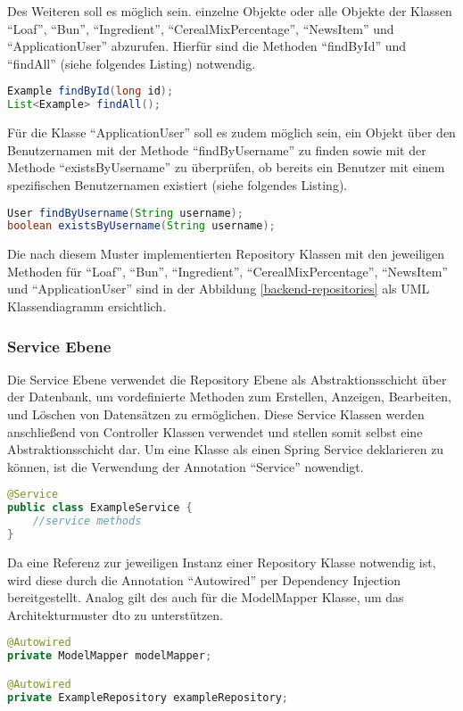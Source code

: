 Des Weiteren soll es möglich sein. einzelne Objekte oder alle Objekte der Klassen \enquote{Loaf}, \enquote{Bun}, \enquote{Ingredient}, \enquote{CerealMixPercentage}, \enquote{NewsItem} und \enquote{ApplicationUser} abzurufen.
Hierfür sind die Methoden \enquote{findById} und \enquote{findAll} (siehe folgendes Listing) notwendig.
\begin{lstlisting}[language=Java]
Example findById(long id);
List<Example> findAll();
\end{lstlisting}

\clearpage

Für die Klasse \enquote{ApplicationUser} soll es zudem möglich sein, ein Objekt über den Benutzernamen mit der Methode \enquote{findByUsername} zu finden sowie mit der Methode \enquote{existsByUsername} zu überprüfen, ob bereits ein Benutzer mit einem spezifischen Benutzernamen existiert (siehe folgendes Listing).
\begin{lstlisting}[language=Java]
User findByUsername(String username);
boolean existsByUsername(String username);
\end{lstlisting}
Die nach diesem Muster implementierten Repository Klassen mit den jeweiligen Methoden für \enquote{Loaf}, \enquote{Bun}, \enquote{Ingredient}, \enquote{CerealMixPercentage}, \enquote{NewsItem} und \enquote{ApplicationUser} sind in der Abbildung \ref{backend-repositories} als UML Klassendiagramm ersichtlich.


\clearpage

\subsubsection{Service Ebene}
Die Service Ebene verwendet die Repository Ebene als Abstraktionsschicht über der Datenbank, um vordefinierte Methoden zum Erstellen, Anzeigen, Bearbeiten, und Löschen von Datensätzen zu ermöglichen. Diese Service Klassen werden anschließend von Controller Klassen verwendet und stellen somit selbst eine Abstraktionsschicht dar.
Um eine Klasse als einen Spring Service deklarieren zu können, ist die Verwendung der Annotation \enquote{Service} nowendigt.
\begin{lstlisting}[language=Java]
@Service
public class ExampleService {
	//service methods
}
\end{lstlisting}

Da eine Referenz zur jeweiligen Instanz einer Repository Klasse notwendig ist, wird diese durch die Annotation \enquote{Autowired} per Dependency Injection bereitgestellt. Analog gilt des auch für die ModelMapper Klasse, um das Architekturmuster \gls{dto} zu unterstützen.
\begin{lstlisting}[language=Java]
@Autowired
private ModelMapper modelMapper;

@Autowired
private ExampleRepository exampleRepository;
\end{lstlisting}

